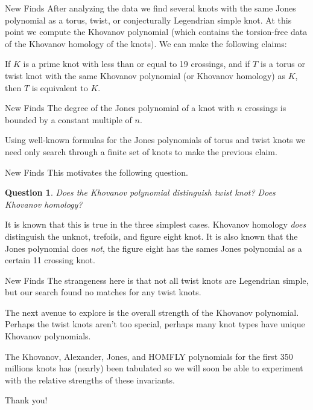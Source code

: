 \documentclass{beamer}
\newtheorem{question}{Question}
\begin{document}
    \begin{frame}{New Finds}
        After analyzing the data we find several knots with the
        same Jones polynomial as a torus, twist, or conjecturally Legendrian
        simple knot. At this point we compute the Khovanov polynomial
        (which contains the torsion-free data of the Khovanov homology of the
        knots). We can make the following claims:
        \begin{theorem}
            If $K$ is a prime knot with less than or equal to 19 crossings,
            and if $T$ is a torus or twist knot with the same Khovanov
            polynomial (or Khovanov homology) as $K$,
            then $T$ is equivalent to $K$.
        \end{theorem}
    \end{frame}
    \begin{frame}{New Finds}
        The degree of the Jones polynomial of a knot with $n$ crossings is
        bounded by a constant multiple of $n$.
        \par\hfill\par
        Using well-known formulas for
        the Jones polynomials of torus and twist knots we need only search
        through a finite set of knots to make the previous claim.
    \end{frame}
    \begin{frame}{New Finds}
        This motivates the following question.
        \begin{question}
            Does the Khovanov polynomial distinguish twist knot?
            Does Khovanov homology?
        \end{question}
        It is known that this is true in the three simplest cases.
        Khovanov homology \textit{does} distinguish the unknot, trefoils, and
        figure eight knot. It is also known that the Jones polynomial
        does \textit{not}, the figure eight has the sames Jones polynomial
        as a certain 11 crossing knot.
    \end{frame}
    \begin{frame}{New Finds}
        The strangeness here is that not all twist knots are Legendrian simple,
        but our search found no matches for any twist knots.
        \par\hfill\par
        The next avenue to explore is the overall strength of the Khovanov
        polynomial. Perhaps the twist knots aren't too special, perhaps many
        knot types have unique Khovanov polynomials.
        \par\hfill\par
        The Khovanov, Alexander, Jones, and HOMFLY polynomials for the first
        350 millions knots has (nearly) been tabulated so we will soon be able
        to experiment with the relative strengths of these invariants.
    \end{frame}
    \begin{frame}
        \centering
        Thank you!
    \end{frame}
\end{document}
